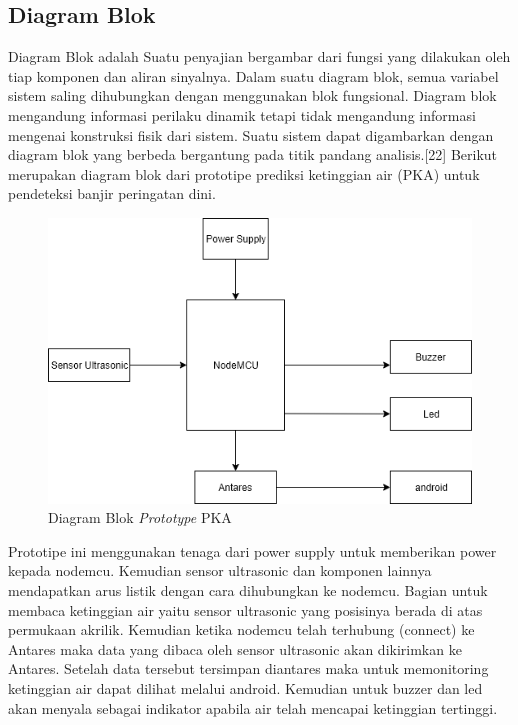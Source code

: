\subsection{Diagram Blok}
Diagram Blok adalah Suatu penyajian bergambar dari fungsi yang dilakukan oleh tiap komponen dan aliran sinyalnya. Dalam suatu diagram blok, semua variabel sistem saling dihubungkan dengan menggunakan blok fungsional. Diagram blok mengandung informasi perilaku dinamik tetapi tidak mengandung informasi mengenai konstruksi fisik dari sistem. Suatu sistem dapat digambarkan dengan diagram blok yang berbeda bergantung pada titik pandang analisis.[22] Berikut merupakan diagram blok dari prototipe prediksi ketinggian air (PKA) untuk pendeteksi banjir  peringatan  dini.

\begin{figure}[H]
\centering
\includegraphics[width=1\textwidth]{figures/diagramblok.png}
\caption{Diagram Blok \textit{Prototype} PKA}
\label{print}
\end{figure}
Prototipe ini menggunakan tenaga dari power supply untuk memberikan power kepada nodemcu. Kemudian sensor ultrasonic dan komponen lainnya mendapatkan arus listik dengan cara dihubungkan ke nodemcu. Bagian untuk membaca ketinggian air yaitu sensor ultrasonic yang posisinya berada di atas permukaan akrilik. Kemudian ketika nodemcu telah terhubung (connect)  ke Antares maka data yang dibaca oleh sensor ultrasonic akan dikirimkan ke Antares. Setelah data tersebut tersimpan diantares maka untuk memonitoring ketinggian air dapat dilihat melalui android. Kemudian untuk buzzer dan led akan menyala sebagai indikator apabila air telah mencapai ketinggian tertinggi.

